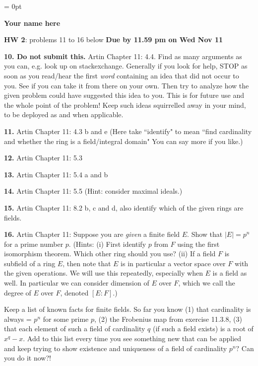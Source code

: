 \documentclass{article}
\begin{document}
\parindent = 0pt
{\centerline {\bf Your name here}}

\medskip

{\bf HW 2}: problems 11 to 16  below  
\hfill {\bf Due by 11.59 pm on Wed Nov  11}

\bigskip

{\bf 10. Do not submit this.}  Artin Chapter 11:  4.4. Find as many arguments as you can, e.g. look up on stackexchange. Generally if you look for help, STOP as soon as you read/hear the first {\it word} containing an idea that did not occur to you. See if you can take it from there on your own. Then try to analyze how the given problem could have suggested this idea to you. This is for future use and the whole point of the problem! Keep such ideas squirrelled away in your mind, to be deployed as and when applicable.

\medskip

{\bf 11.}  Artin Chapter 11: 4.3 b and e (Here take ``identify" to mean ``find cardinality and whether the ring is a field/integral domain" You can say more if you like.) 

\medskip


\medskip

{\bf 12.}  Artin Chapter 11: 5.3

\medskip

{\bf 13.}  Artin Chapter 11: 5.4 a and b

\medskip

{\bf 14.}  Artin Chapter 11: 5.5 (Hint: consider maximal ideals.)

\medskip

{\bf 15.}  Artin Chapter 11: 8.2 b, c and d, also identify which of the given rings are fields.

\medskip

{\bf 16.}  Artin Chapter 11: Suppose you are {\it given} a finite field $E$. Show that $ |E| = p^n$ for a prime number $p$. (Hints: (i) First identify $p$ from $F$ using the first isomorphism theorem. Which other ring should you use? (ii) If a field $F$ is subfield of a ring $E$, then note that $E$ is in particular a vector space over $F$ with the given operations. We will use this repeatedly, especially when $E$ is a field as well. In particular we can consider dimension of $E$ over $F$, which we call the degree of $E$ over $F$, denoted $[E:F]$.)

\medskip

Keep a list of known facts for finite fields. So far you know (1)  that cardinality is always = $p^n$  for some prime $p$, (2) the Frobenius map from exercise 11.3.8, (3) that each element of such a field of cardinality $q$ (if such a field exists) is a root of $x^q - x$. Add to this list every time you see something new that can be applied and keep trying to show existence and uniqueness of a field of cardinality $p^n?$ Can you do it now?! %
\end{document}
